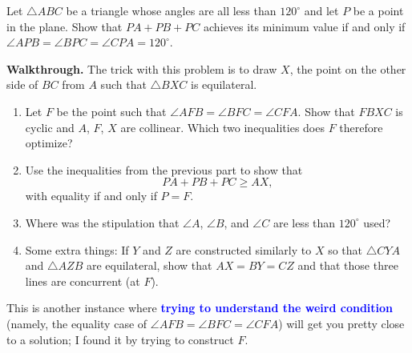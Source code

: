 \documentclass{scrartcl}
\providecommand{\dg}{^\circ}
\providecommand{\ii}{\item}
\providecommand{\alert}[1]{{\sffamily\textbf{\textcolor{blue}{#1}}}}
\newenvironment{walkthrough}{\noindent\textbf{Walkthrough.}}{}
\begin{document}
\begin{example}
	Let $\triangle ABC$ be a triangle whose angles are all less than $120\dg$
	and let $P$ be a point in the plane.
	Show that $PA + PB + PC$ achieves its minimum value if and only if
	$\angle APB = \angle BPC = \angle CPA = 120\dg$.
\end{example}

\begin{walkthrough}
	The trick with this problem is to draw $X$, the point on the other side
	of $BC$ from $A$ such that $\triangle BXC$ is equilateral.
	\begin{enumerate}[label=\textbf{(\alph*)}]
		\ii Let $F$ be the point such that
		$\angle AFB = \angle BFC = \angle CFA$. Show that $FBXC$ is cyclic and
		$A$, $F$, $X$ are collinear.
		Which two inequalities does $F$ therefore optimize?
		\ii Use the inequalities from the previous part
		to show that
		\[PA + PB + PC \ge AX,\]
		with equality if and only if $P = F$.
		\ii Where was the stipulation that $\angle A$, $\angle B$, and $\angle C$
		are less than $120\dg$ used?
		\ii Some extra things: If $Y$ and $Z$ are constructed similarly to $X$
		so that $\triangle CYA$ and $\triangle AZB$ are equilateral,
		show that $AX = BY = CZ$ and that those three lines are concurrent
		(at $F$).
	\end{enumerate}
	
	This is another instance where
	\alert{trying to understand the weird condition}
	(namely, the equality case of $\angle AFB = \angle BFC = \angle CFA$)
	will get you pretty close to a solution;
	I found it by trying to construct $F$.
\end{walkthrough}
\end{document}
